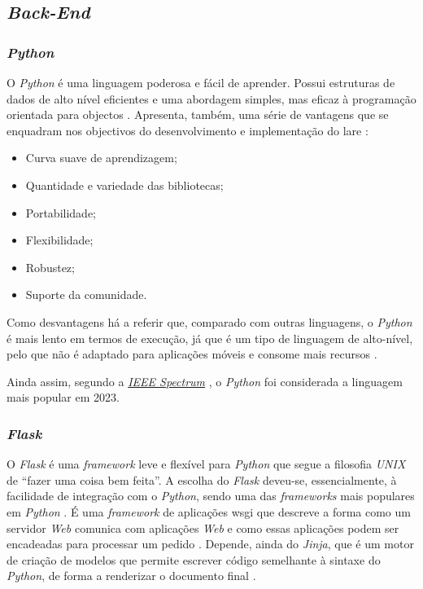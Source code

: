 \subsection{\textit{Back-End}}
\subsubsection{\textit{Python}}
O \textit{Python} é uma linguagem poderosa e fácil de aprender. Possui estruturas de dados de alto nível eficientes e uma abordagem simples, mas eficaz à programação orientada para objectos \cite{ThePython}. Apresenta, também, uma série de vantagens que se enquadram nos objectivos do desenvolvimento e implementação do \acrshort{lare} \cite{pythonvantagens}:
\begin{itemize}
	\item Curva suave de aprendizagem;
	\item Quantidade e variedade das bibliotecas;
	\item Portabilidade;
	\item Flexibilidade;
	\item Robustez;
	\item Suporte da comunidade.
\end{itemize}

Como desvantagens há a referir que, comparado com outras linguagens, o \textit{Python} é mais lento em termos de execução, já que é um tipo de linguagem de alto-nível, pelo que não é adaptado para aplicações móveis e consome mais recursos \cite{pythonvantagens} \cite{5MainDispython}.

Ainda assim, segundo a \textit{\href{https://spectrum.ieee.org/the-top-programming-languages-2023}{\textit{IEEE Spectrum}}} \cite{ieeespectrum}, o \textit{Python} foi considerada a linguagem mais popular em 2023.

\subsubsection{\textit{Flask}}
O \textit{Flask} é uma \textit{framework} leve e flexível para \textit{Python} que segue a filosofia \textit{UNIX} de ``fazer uma coisa bem feita''. A escolha do \textit{Flask} deveu-se, essencialmente, à facilidade de integração com o \textit{Python}, sendo uma das \textit{frameworks} mais populares em \textit{Python} \cite{Flask}. É uma \textit{framework} de aplicações \acrfull{wsgi} que descreve a forma como um servidor \textit{Web} comunica com aplicações \textit{Web} e como essas aplicações podem ser encadeadas para processar um pedido \cite{wsgi}. Depende, ainda do  \textit{Jinja}, que é um motor de criação de modelos que permite escrever código semelhante à sintaxe do \textit{Python}, de forma a renderizar o documento final \cite{Jinja}.

